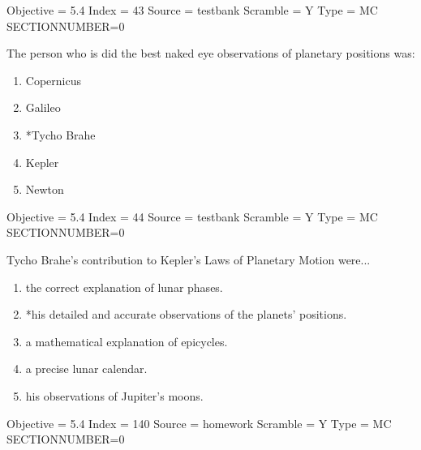 \documentclass[11pt]{article}
\begin{document}
\begin{enumerate}
\begin{minipage}{\textwidth}
\begin{minipage}{\textwidth}
Objective = 5.4
Index = 43
Source = testbank
Scramble = Y
Type = MC
SECTIONNUMBER=0
\end{minipage}
\end{minipage}
\vskip 0.20in

\begin{minipage}{\textwidth}
\begin{minipage}{\textwidth}
\item The person who is did the best naked eye observations of planetary positions was:
\begin{multicols}{3}
\begin{enumerate} 
\setlength{\itemsep}{1pt} 
\setlength{\parskip}{0pt} 
\setlength{\parsep}{0pt}
\setlength{\multicolsep}{1pt} 
\item Copernicus
\item Galileo
\item *Tycho Brahe
\item Kepler
\item Newton
\end{enumerate} 
\vfill 
\end{multicols}

Objective = 5.4
Index = 44
Source = testbank
Scramble = Y
Type = MC
SECTIONNUMBER=0
\end{minipage}
\end{minipage}
\vskip 0.20in

\begin{minipage}{\textwidth}
\begin{minipage}{\textwidth}
\item Tycho Brahe's contribution to Kepler's Laws of Planetary Motion were...
\begin{enumerate} 
\setlength{\itemsep}{1pt} 
\setlength{\parskip}{0pt} 
\setlength{\parsep}{0pt}
\setlength{\multicolsep}{1pt} 
\item the correct explanation of lunar phases.
\item *his detailed and accurate observations of the planets' positions.
\item a mathematical explanation of epicycles.
\item a precise lunar calendar.
\item his observations of Jupiter's moons.
\end{enumerate} 
Objective = 5.4
Index = 140
Source = homework
Scramble = Y
Type = MC
SECTIONNUMBER=0
\end{minipage}
\end{minipage}
\vskip 0.20in


\end{enumerate}
\end{document}
